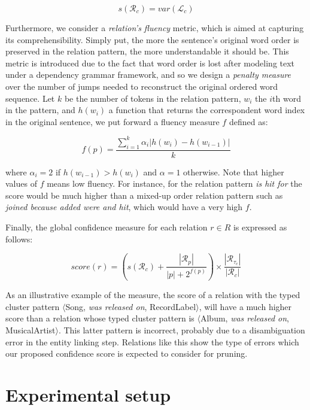 \begin{equation}
s(\mathcal{R}_c) = var(\mathcal{L}_c)
\end{equation}

Furthermore, we consider a \textit{relation's fluency} metric, which is aimed at capturing its comprehensibility. Simply put, the more the sentence's original word order is preserved in the relation pattern, the more understandable it should be. This metric is introduced due to the fact that word order is lost after modeling text under a dependency grammar framework, and so we design a \textit{penalty measure} over the number of jumps needed to reconstruct the original ordered word sequence. Let $k$ be the number of tokens in the relation pattern, $w_i$ the $i$th word in the pattern, and $h(w_i)$ a function that returns the correspondent word index in the original sentence, we put forward a fluency measure $f$ defined as:

\begin{equation}
f(p) = \frac{\sum_{i=1}^{k} \alpha_i | h(w_i) - h(w_{i-1}) |}{k}
\end{equation}

where $\alpha_i=2$ if $h(w_{i-1}) > h(w_i)$ and $\alpha=1$ otherwise. Note that higher values of $f$ means low fluency. For instance, for the relation pattern \textit{is hit for} the score would be much higher than a mixed-up order relation pattern such as \textit{joined because added were and hit}, which would have a very high $f$.  

Finally, the global confidence measure for each relation $r \in R$ is expressed as follows:

\begin{equation}
score(r) = \left({s(\mathcal{R}_c) + \frac{|\mathcal{R}_p|}{|p|+2^{f(p)}}}\right) \times {\frac{|\mathcal{R}_{\tau_c}|}{|\mathcal{R}_c|}}
\end{equation}

As an illustrative example of the measure, the score of a relation with the typed cluster pattern $\langle$Song, \textit{was released on}, RecordLabel$\rangle$, will have a much higher score than a relation whose typed cluster pattern is $\langle$Album, \textit{was released on}, MusicalArtist$\rangle$. This latter pattern is incorrect, probably due to a disambiguation error in the entity linking step. Relations like this show the type of errors which our proposed confidence score is expected to consider for pruning.



\section{Experimental setup}\label{sec:kb:exp}

